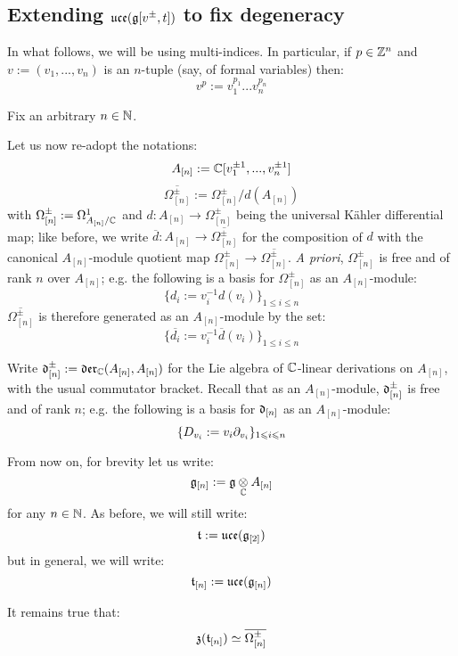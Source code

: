        \subsection{Extending \texorpdfstring{$ \mathfrak{uce}(\mathfrak{g}[v^{\pm}, t]) $}{} to fix degeneracy}
            \begin{convention} 
                In what follows, we will be using multi-indices. In particular, if $p \in \mathbb{Z}^n$ and ${v} := (v_1, ..., v_n)$ is an $n$-tuple (say, of formal variables) then:
                    $${v}^{p} := v_1^{p_1} ... v_n^{p_n}$$
            \end{convention}
            \begin{convention}
                Fix an arbitrary $n \in \mathbb{N}$.
            
                Let us now re-adopt the notations:
                    $$A_{[n]} := \mathbb{C}[v_1^{\pm 1}, ..., v_n^{\pm 1}]$$
                    $$\overline{\Omega_{[n]}^{\pm}} := \Omega_{[n]}^{\pm}/d(A_{[n]})$$
                with $\Omega_{[n]}^{\pm} := \Omega^1_{A_{[n]}/\mathbb{C}}$ and $d: A_{[n]} \to \Omega_{[n]}^{\pm}$ being the universal K\"ahler differential map; like before, we write $\overline{d}: A_{[n]} \to \overline{\Omega_{[n]}^{\pm}}$ for the composition of $d$ with the canonical $A_{[n]}$-module quotient map $\Omega_{[n]}^{\pm} \to \overline{\Omega_{[n]}^{\pm}}$. \textit{A priori}, $\Omega^{\pm}_{[n]}$ is free and of rank $n$ over $A_{[n]}$; e.g. the following is a basis for $\Omega^{\pm}_{[n]}$ as an $A_{[n]}$-module:
                    $$\{ d_i := v_i^{-1} d(v_i) \}_{1 \leq i \leq n}$$
                $\overline{\Omega^{\pm}_{[n]}}$ is therefore generated as an $A_{[n]}$-module by the set:
                    $$\{ \overline{d_i} := v_i^{-1} \overline{d}(v_i) \}_{1 \leq i \leq n}$$
                    
                Write $\mathfrak{d}_{[n]}^{\pm} := \mathfrak{der}_{\mathbb{C}}(A_{[n]}, A_{[n]})$ for the Lie algebra of $\mathbb{C}$-linear derivations on $A_{[n]}$, with the usual commutator bracket. Recall that as an $A_{[n]}$-module, $\mathfrak{d}_{[n]}^{\pm}$ is free and of rank $n$; e.g. the following is a basis for $\mathfrak{d}_{[n]}$ as an $A_{[n]}$-module:
                    $$\{D_{v_i} := v_i \partial_{v_i}\}_{1 \leqslant i \leqslant n}$$
            \end{convention}
            \begin{convention}
                From now on, for brevity let us write:
                    $$\g_{[n]} := \g \tensor_{\bbC} A_{[n]}$$
                for any $n \in \mathbb{N}$. As before, we will still write:
                    $$\mathfrak{t} := \mathfrak{uce}(\mathfrak{g}_{[2]})$$
                but in general, we will write:
                    $$\mathfrak{t}_{[n]} := \mathfrak{uce}(\mathfrak{g}_{[n]})$$
            \end{convention}
            \begin{remark}
                It remains true that:
                    $$\mathfrak{z}(\mathfrak{t}_{[n]}) \simeq \overline{\Omega^{\pm}_{[n]}}$$
            \end{remark}

